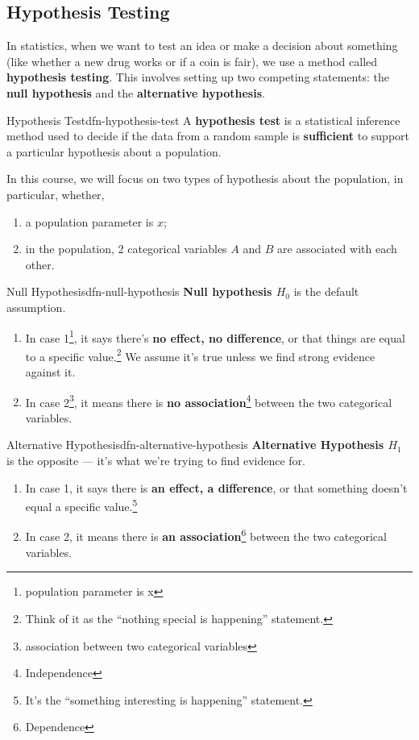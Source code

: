 \documentclass[math,code]{amznotes}
\theoremstyle{remark}
\begin{document}
\subsection{Hypothesis Testing}
In statistics, when we want to test an idea or make a decision about something (like whether a new drug works or if a coin is fair), we use a method called \textbf{hypothesis testing}. This involves setting up two competing statements: the \textbf{null hypothesis} and the \textbf{alternative hypothesis}.
\begin{dfnbox}{Hypothesis Test}{dfn-hypothesis-test}
    A {\color{red} \textbf{hypothesis test}} is a statistical inference method used to decide if the data from a random sample is \textbf{sufficient} to support a particular hypothesis about a population.
\end{dfnbox}
In this course, we will focus on two types of hypothesis about the population, in particular, whether,
\begin{enumerate}
    \item a population parameter is $x$;
    \item in the population, 2 categorical variables $A$ and $B$ are associated with each other.
\end{enumerate}
\begin{dfnbox}{Null Hypothesis}{dfn-null-hypothesis}
    {\color{red} \textbf{Null hypothesis $H_0$}} is the default assumption. 
    \begin{enumerate}
        \item In case 1\footnote{population parameter is x}, it says there’s \textbf{no effect, no difference}, or that things are equal to a specific value.\footnote{Think of it as the ``nothing special is happening'' statement.} We assume it’s true unless we find strong evidence against it.
        \item In case 2\footnote{association between two categorical variables}, it means there is \textbf{no association}\footnote{Independence} between the two categorical variables.
    \end{enumerate}
\end{dfnbox}
\begin{dfnbox}{Alternative Hypothesis}{dfn-alternative-hypothesis}
    {\color{red} \textbf{Alternative Hypothesis $H_1$}} is the opposite — it’s what we’re trying to find evidence for.
    \begin{enumerate}
        \item In case 1, it says there is \textbf{an effect, a difference}, or that something doesn’t equal a specific value.\footnote{It’s the ``something interesting is happening'' statement.}
        \item In case 2, it means there is \textbf{an association}\footnote{Dependence} between the two categorical variables.
    \end{enumerate}
\end{dfnbox}
\end{document}
